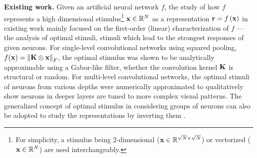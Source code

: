 \documentclass[10pt,twocolumn,letterpaper]{article}
\begin{document}

\newcommand{\expstimdim}{For simplicity, a stimulus being 2-dimensional (\ie ${\bf{x}} \in \mathbb{R}^{\sqrt{N} \times \sqrt{N}}$) or vectorized (\ie ${\bf{x}} \in \mathbb{R}^N$) are used interchangeably.}

{\bf Existing work.} 
Given an artificial neural network $f$, the study of how $f$ represents a high dimensional stimulus\footnote{\expstimdim} ${\bf{x}} \in \mathbb{R}^N$ as a representation 
${\bf{r}} = f\left( {\bf{x}} \right)$ in existing work mainly focused on the first-order (\ie linear) characterization of $f$ --- the analysis of optimal stimuli, stimuli which lead to the strongest responses of given neurons.
For single-level convolutional networks using squared pooling, \ie $f({\bf{x}}) = \left\| {\bf{K}} \otimes {\bf{x}} \right\|_{F}$, the optimal stimulus was shown to be analytically approximable \cite{saxe2011random} using a Gabor-like filter, whether the convolution kernel $\bf{K}$ is structural or random.
For multi-level convolutional networks, the optimal stimuli of neurons from various depths were numerically approximated \cite{ngiam2010tiled, le2012building, zeiler2014visualizing, simonyan2013deep} to qualitatively show neurons in deeper layers are tuned to more complex visual patterns.
The generalized concept of optimal stimulus in considering groups of neurons can also be adopted to study the representations by inverting them \cite{mahendran2014understanding}.
\end{document}
